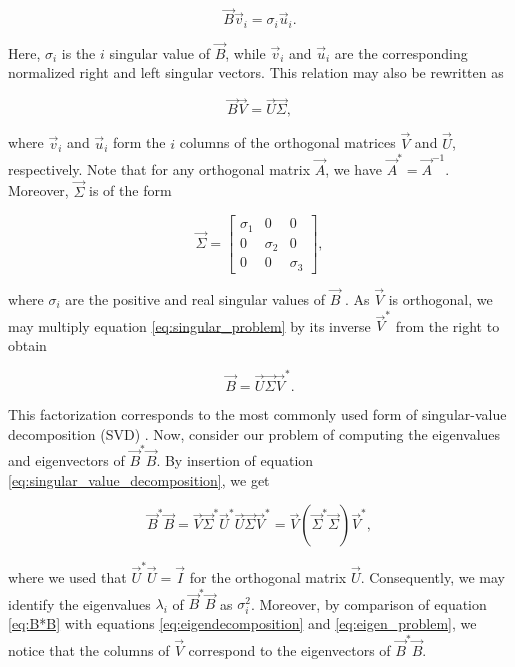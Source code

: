\begin{equation}
\vec{B}\vec{v}_i = \sigma_i\vec{u}_i.
\end{equation}

\noindent Here, $\sigma_i$ is the $i$ singular value of $\vec{B}$, while $\vec{v}_i$ and $\vec{u}_i$ are the corresponding normalized right and left singular vectors. This relation may also be rewritten as 

\begin{equation}\label{eq:singular_problem}
\vec{B}\vec{V} = \vec{U}\vec{\Sigma}, 
\end{equation}

\noindent where $\vec{v}_i$ and $\vec{u}_i$ form the $i$ columns of the orthogonal matrices $\vec{V}$ and $\vec{U}$, respectively. Note that for any orthogonal matrix $\vec{A}$, we have $\vec{A}^*=\vec{A}^{-1}$. Moreover, $\vec{\Sigma}$ is of the form

\begin{equation}
	\vec{\Sigma} =
	\begin{bmatrix}
		\sigma_1 & 0 & 0 \\[2ex]
		0 & \sigma_2 & 0 \\[2ex]
		0 & 0 & \sigma_3
	\end{bmatrix},
\end{equation}

\noindent where $\sigma_i$ are the positive and real singular values of $\vec{B}$ \citep{trefethen97}. As $\vec{V}$ is orthogonal, we may multiply equation \eqref{eq:singular_problem} by its inverse $\vec{V}^*$ from the right to obtain

\begin{equation}\label{eq:singular_value_decomposition}
\vec{B} = \vec{U}\vec{\Sigma}\vec{V}^*.
\end{equation}

This factorization corresponds to the most commonly used form of singular-value decomposition (SVD) \citep{trefethen97}. Now, consider our problem of computing the eigenvalues and eigenvectors of $\vec{B}^*\vec{B}$. By insertion of equation \eqref{eq:singular_value_decomposition}, we get

\begin{equation}\label{eq:B*B}
\vec{B}^*\vec{B} = \vec{V}\vec{\Sigma}^*\vec{U}^*\vec{U}\vec{\Sigma}\vec{V}^* =
\vec{V}(\vec{\Sigma}^*\vec{\Sigma})\vec{V}^*, 
\end{equation}

\noindent where we used that $\vec{U}^*\vec{U}=\vec{I}$ for the orthogonal matrix $\vec{U}$. Consequently, we may identify the eigenvalues $\lambda_i$ of $\vec{B}^*\vec{B}$ as $\sigma_i^2$. Moreover, by comparison of equation \eqref{eq:B*B} with equations \eqref{eq:eigendecomposition} and \eqref{eq:eigen_problem}, we notice that the columns of $\vec{V}$ correspond to the eigenvectors of $\vec{B}^*\vec{B}$.

